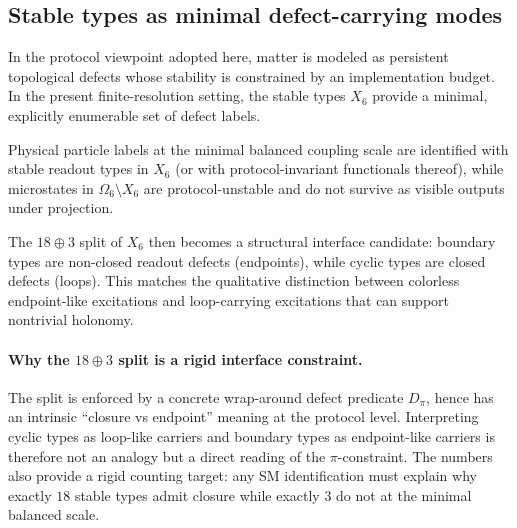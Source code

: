 \subsection{Stable types as minimal defect-carrying modes}
\label{subsec:matter_as_types}

In the protocol viewpoint adopted here, matter is modeled as persistent topological defects whose stability is constrained by an implementation budget.
In the present finite-resolution setting, the stable types $X_6$ provide a minimal, explicitly enumerable set of defect labels.

\begin{definition}
\label{ax:particles_as_types}
Physical particle labels at the minimal balanced coupling scale are identified with stable readout types in $X_6$ (or with protocol-invariant functionals thereof), while microstates in $\Omega_6\setminus X_6$ are protocol-unstable and do not survive as visible outputs under projection.
\end{definition}

The $18\oplus 3$ split of $X_6$ then becomes a structural interface candidate:
boundary types are non-closed readout defects (endpoints), while cyclic types are closed defects (loops).
This matches the qualitative distinction between colorless endpoint-like excitations and loop-carrying excitations that can support nontrivial holonomy.

\paragraph{Why the $18\oplus 3$ split is a rigid interface constraint.}
The split is enforced by a concrete wrap-around defect predicate $D_\pi$, hence has an intrinsic ``closure vs endpoint'' meaning at the protocol level.
Interpreting cyclic types as loop-like carriers and boundary types as endpoint-like carriers is therefore not an analogy but a direct reading of the $\pi$-constraint.
The numbers also provide a rigid counting target: any SM identification must explain why exactly $18$ stable types admit closure while exactly $3$ do not at the minimal balanced scale.

